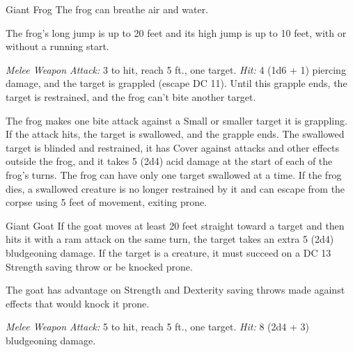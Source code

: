 \documentclass[10pt,a4paper,twoside,bg=print,twocolumn,openany,nodeprecatedcode]{dndbook}
\begin{document}
\begin{DndMonster}[float=t]{Giant Frog}
\DndMonsterBasics[
armor-class = {11},
hit-points = {\DndDice{4d8}},
speed = {30 ft., swim 30 ft.}
]
\DndMonsterAbilityScores[
 str = 12,
 dex = 13,
 con = 11,
 int = 2,
 wis = 10,
 cha = 3
]
\DndMonsterDetails[
skills = {Perception +2, Stealth +3},
senses = {darkvision 30 ft., passive perception 12},
challenge = 1/4,
]
The frog can breathe air and water.

The frog's long jump is up to 20 feet and its high jump is up to 10 feet, with or without a running start.

\textsl{Melee Weapon Attack:} 3 to hit, reach 5 ft., one target. \textsl{Hit:} 4 (1d6 + 1) piercing damage, and the target is grappled (escape DC 11). Until this grapple ends, the target is restrained, and the frog can't bite another target.

The frog makes one bite attack against a Small or smaller target it is grappling. If the attack hits, the target is swallowed, and the grapple ends. The swallowed target is blinded and restrained, it has Cover against attacks and other effects outside the frog, and it takes 5 (2d4) acid damage at the start of each of the frog's turns. The frog can have only one target swallowed at a time. If the frog dies, a swallowed creature is no longer restrained by it and can escape from the corpse using 5 feet of movement, exiting prone.

\end{DndMonster}



\begin{DndMonster}[float=t]{Giant Goat}
\DndMonsterBasics[
armor-class = {11 (natural armor)},
hit-points = {\DndDice{3d10 + 3}},
speed = {40 ft.}
]
\DndMonsterAbilityScores[
 str = 17,
 dex = 11,
 con = 12,
 int = 3,
 wis = 12,
 cha = 6
]
\DndMonsterDetails[
challenge = 1/2,
]
If the goat moves at least 20 feet straight toward a target and then hits it with a ram attack on the same turn, the target takes an extra 5 (2d4) bludgeoning damage. If the target is a creature, it must succeed on a DC 13 Strength saving throw or be knocked prone.

The goat has advantage on Strength and Dexterity saving throws made against effects that would knock it prone.

\textsl{Melee Weapon Attack:} 5 to hit, reach 5 ft., one target. \textsl{Hit:} 8 (2d4 + 3) bludgeoning damage.

\end{DndMonster}
\end{document}
